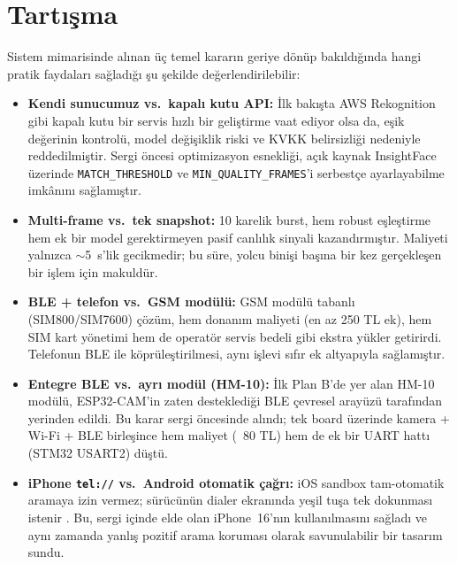 \section{Tartışma}

Sistem mimarisinde alınan üç temel kararın geriye dönüp bakıldığında
hangi pratik faydaları sağladığı şu şekilde değerlendirilebilir:

\begin{itemize}
    \item \textbf{Kendi sunucumuz vs.\ kapalı kutu API:} İlk bakışta
          AWS Rekognition gibi kapalı kutu bir servis hızlı bir geliştirme
          vaat ediyor olsa da, eşik değerinin kontrolü, model değişiklik
          riski ve KVKK belirsizliği nedeniyle reddedilmiştir. Sergi
          öncesi optimizasyon esnekliği, açık kaynak InsightFace üzerinde
          \texttt{MATCH\_THRESHOLD} ve \texttt{MIN\_QUALITY\_FRAMES}'i
          serbestçe ayarlayabilme imkânını sağlamıştır.
    \item \textbf{Multi-frame vs.\ tek snapshot:} 10 karelik burst, hem
          robust eşleştirme hem ek bir model gerektirmeyen pasif canlılık
          sinyali kazandırmıştır. Maliyeti yalnızca $\sim$5~s'lik
          gecikmedir; bu süre, yolcu binişi başına bir kez gerçekleşen
          bir işlem için makuldür.
    \item \textbf{BLE + telefon vs.\ GSM modülü:} GSM modülü tabanlı
          (SIM800/SIM7600) çözüm, hem donanım maliyeti (en az 250 TL
          ek), hem SIM kart yönetimi hem de operatör servis bedeli gibi
          ekstra yükler getirirdi. Telefonun BLE ile köprüleştirilmesi,
          aynı işlevi sıfır ek altyapıyla sağlamıştır.
    \item \textbf{Entegre BLE vs.\ ayrı modül (HM-10):} İlk Plan B'de yer
          alan HM-10 modülü, ESP32-CAM'in zaten desteklediği BLE
          çevresel arayüzü tarafından yerinden edildi. Bu karar sergi
          öncesinde alındı; tek board üzerinde kamera + Wi-Fi + BLE
          birleşince hem maliyet (~80 TL) hem de ek bir UART hattı
          (STM32 USART2) düştü.
    \item \textbf{iPhone \texttt{tel://} vs.\ Android otomatik çağrı:}
          iOS sandbox tam-otomatik aramaya izin vermez; sürücünün
          dialer ekranında yeşil tuşa tek dokunması istenir
          \cite{apple_tel_url}. Bu, sergi içinde elde olan iPhone~16'nın
          kullanılmasını sağladı ve aynı zamanda yanlış pozitif arama
          koruması olarak savunulabilir bir tasarım sundu.
\end{itemize}

